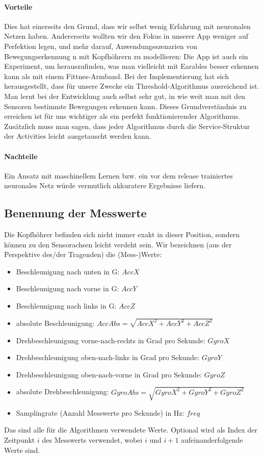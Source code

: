 \documentclass[a4paper,12pt]{article}
\begin{document}
\paragraph{Vorteile}
Dies hat einerseits den Grund, dass wir selbst wenig Erfahrung mit neuronalen Netzen haben. Andererseits wollten wir den Fokus in unserer App weniger auf Perfektion legen, und mehr darauf, Anwendungsszenarien von Bewegungserkennung n mit Kopfhöhrern zu modellieren: Die App ist auch ein Experiment, um herauszufinden, was man vielleicht mit Earables besser erkennen kann als mit einem Fittnes-Armband. Bei der Implementierung hat sich herausgestellt, dass für unsere Zwecke ein Threshold-Algorithmus ausreichend ist. Man lernt bei der Entwicklung auch selbst sehr gut, in wie weit man mit den Sensoren bestimmte Bewegungen erkennen kann. Dieses Grundverständnis zu erreichen ist für uns wichtiger als ein perfekt funktionierender Algorithmus.\\
Zusätzlich muss man sagen, dass jeder Algorithmus durch die Service-Struktur der Activities leicht ausgetauscht werden kann.
\paragraph{Nachteile}
Ein Ansatz mit maschinellem Lernen bzw. ein vor dem release trainiertes neuronales Netz würde vermutlich akkuratere Ergebnisse liefern. 
\subsection{Benennung der Messwerte}
Die Kopfhöhrer befinden sich nicht immer exakt in dieser Position, sondern können zu den Sensorachsen leicht verdeht sein. Wir bezeichnen (aus der Perspektive des/der Tragenden) die (Mess-)Werte:
\begin{itemize}
	\item Beschleunigung nach unten in G: $AccX$
	\item Beschleunigung nach vorne in G: $AccY$
	\item Beschleunigung nach links in G: $AccZ$
	\item absolute Beschleunigung: $AccAbs = \sqrt{AccX^2+AccY^2+AccZ^2}$
	\item Drehbeschleunigung vorne-nach-rechts in Grad pro Sekunde: $GyroX$ 
	\item Drehbeschleunigung oben-nach-links in Grad pro Sekunde: $GyroY$ 
	\item Drehbeschleunigung oben-nach-vorne in Grad pro Sekunde: $GyroZ$ 
	\item absolute Drehbeschleunigung: $GyroAbs = \sqrt{GyroX^2+GyroY^2+GyroZ^2}$
	\item Samplingrate (Anzahl Messwerte pro Sekunde) in Hz: $freq$
\end{itemize}
Das sind alle für die Algorithmen verwendete Werte. Optional wird als Index der Zeitpunkt $i$ des Messwerts verwendet, wobei $i$ und $i+1$ aufeinanderfolgende Werte sind.
\end{document}
